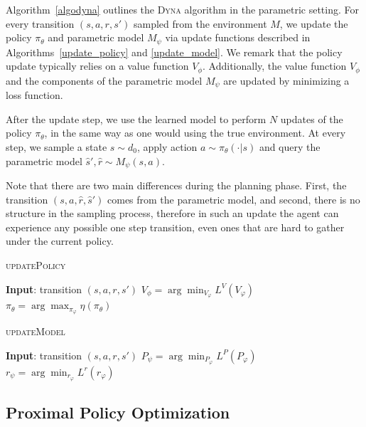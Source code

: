 \documentclass{article}
\begin{document}
	Algorithm~\ref{algodyna} outlines the \textsc{Dyna} algorithm in the parametric setting. 
    For every transition $(s,a,r,s')$ sampled from the environment $M$, we update the policy $\pi_\theta$ and parametric model $M_\psi$ via update functions described in Algorithms~\ref{update_policy} and \ref{update_model}. We remark that the policy update typically relies on a value function $V_\phi$. Additionally, the value function $V_\phi$ and the components of the parametric model $M_\psi$ are updated by minimizing a loss function.
 
    After the update step, we use the learned model to perform $N$ updates of the policy $\pi_\theta$, in the same way as one would using the true environment. At every step, we sample a state $s \sim d_0$, apply action $a \sim \pi_\theta( \cdot \rvert s) $ and query the parametric model $\hat{s}', \hat{r} \sim M_\psi(s,a)$. %
    
    Note that there are two main differences during the planning phase. First, the transition $(s, a, \hat{r}, \hat{s}')$ comes from the parametric model, and second, there is no structure in the sampling process, therefore in such an update the agent can experience any possible one step transition, even ones that are hard to gather under the current policy.
    
    
\begin{algorithm}[t]
	\caption{\textsc{updatePolicy}}
	\begin{algorithmic}[1]
		\STATE \textbf{Input}: transition $(s,a,r,s')$
		\STATE  $V_\phi = \arg\min_{V_\varphi} L^V(V_\varphi)$
		\STATE  $\pi_\theta = \arg\max_{\pi_\varphi} \eta (\pi_\theta)$
	\end{algorithmic}
	\label{update_policy}
\end{algorithm}

\begin{algorithm}[t]
	\caption{\textsc{updateModel}}
	\begin{algorithmic}[1]
		\STATE \textbf{Input}: transition $(s,a,r,s')$
		\STATE  $P_\psi = \arg\min_{P_\varphi} L^P(P_\varphi)$
		\STATE  $r_\psi = \arg\min_{r_\varphi} L^r(r_\varphi)$
	\end{algorithmic}
	\label{update_model}
\end{algorithm}


\subsection{ Proximal Policy Optimization}\label{sec:PPO}
    
\end{document}
